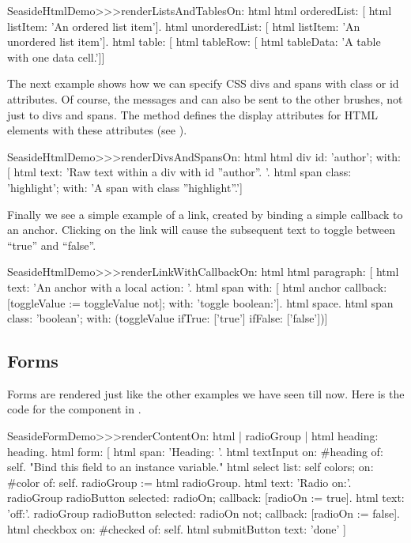 \documentclass[a4paper,10pt,twoside]{book}
\begin{document}
\begin{code}{}
SeasideHtmlDemo>>>renderListsAndTablesOn: html 
	html orderedList: [
		html listItem: 'An ordered list item'].
	html unorderedList: [
		html listItem: 'An unordered list item'].
	html table: [
		html tableRow: [
			html tableData: 'A table with one data cell.']]
\end{code}

The next example shows how we can specify CSS divs and spans with class or id attributes.
Of course, the messages  and  can also be sent to the other brushes, not just to divs and spans.
The method  defines the display attributes for HTML elements with these attributes (see ).

\begin{code}{}
SeasideHtmlDemo>>>renderDivsAndSpansOn: html 
	html div
		id: 'author';
		with: [
			html text: 'Raw text within a div with id ''author''. '.
			html span
				class: 'highlight';
				with: 'A span with class ''highlight''.']
\end{code}

Finally we see a simple example of a link, created by binding a simple callback to an anchor.
Clicking on the link will cause the subsequent text to toggle between ``true'' and ``false''.

\begin{code}{}
SeasideHtmlDemo>>>renderLinkWithCallbackOn: html 
	html paragraph: [
		html text: 'An anchor with a local action: '.
		html span with: [
			html anchor
				callback: [toggleValue := toggleValue not];
				with: 'toggle boolean:'].
		html space.
		html span
			class: 'boolean';
			with: (toggleValue ifTrue: ['true'] ifFalse: ['false'])]
\end{code}


\subsection{Forms}

Forms are rendered just like the other examples we have seen till now.
Here is the code for the  component in .

\begin{code}{}
SeasideFormDemo>>>renderContentOn: html
	| radioGroup |
	html heading: heading.
	html form: [
		html span: 'Heading: '.
		html textInput on: #heading of: self. "Bind this field to an instance variable."
		html select
			list: self colors;
			on: #color of: self.
		radioGroup := html radioGroup.
		html text: 'Radio on:'.
		radioGroup radioButton
			selected: radioOn;
			callback: [radioOn := true].
		html text: 'off:'.
		radioGroup radioButton
			selected: radioOn not;
			callback: [radioOn := false].
		html checkbox on: #checked of: self.
		html submitButton
			text: 'done'
		]
\end{code}{}
\end{document}
